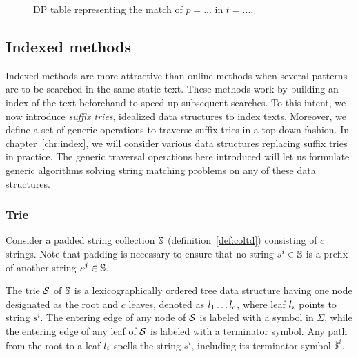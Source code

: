 \begin{figure}[h]
\begin{center}
\caption[Example of approximate string matching via DP]{DP table representing the match of $p=...$ in $t=...$.}
\label{fig:asm-dp}

\end{center}
\end{figure}





\subsection{Indexed methods}
\label{sub:introindex}


Indexed methods are more attractive than online methods when several patterns are to be searched in the same static text.
These methods work by building an index of the text beforehand to speed up subsequent searches.
To this intent, we now introduce \emph{suffix tries}, idealized data structures to index texts.
Moreover, we define a set of generic operations to traverse suffix tries in a top-down fashion.
In chapter~\ref{chr:index}, we will consider various data structures replacing suffix tries in practice.
The generic traversal operations here introduced will let us formulate generic algorithms solving string matching problems on any of these data structures.

\subsubsection{Trie}

Consider a padded string collection $\mathbb {S}$ (definition~\ref{def:coltd}) consisting of $c$ strings.
Note that padding is necessary to ensure that no string $s^i \in \mathbb {S}$ is a prefix of another string $s^j \in \mathbb {S}$.
\begin{definition}
The trie $\mathcal {S}$ of $\mathbb {S}$ is a lexicographically ordered tree data structure having one node designated as the root and $c$ leaves, denoted as $l_1 \dots l_c$, where leaf $l_i$ points to string $s^i$.
The entering edge of any node of $\mathcal {S}$ is labeled with a symbol in $\Sigma$, while the entering edge of any leaf of $\mathcal {S}$ is labeled with a terminator symbol.
Any path from the root to a leaf $l_i$ spells the string $s^i$, including its terminator symbol $\$^i$.
\end{definition}


